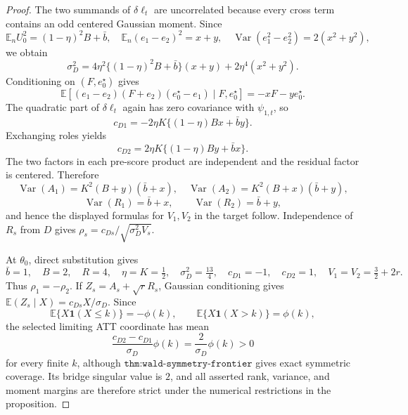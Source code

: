 \documentclass{article}
\begin{document}
\begin{proof}
The two summands of \(\delta\ell_t\) are uncorrelated because every cross term contains an odd centered Gaussian moment.  Since
\[
 \mathbb E_nU_0^2=(1-\eta)^2B+\bar b,\quad
 \mathbb E_n(e_1-e_2)^2=x+y,\quad
 \operatorname{Var}(e_1^2-e_2^2)=2(x^2+y^2),
\]
we obtain
\[
 \sigma_D^2=4\eta^2\{(1-\eta)^2B+\bar b\}(x+y)
 +2\eta^4(x^2+y^2).
\]
Conditioning on \((F,e_0^{\star})\) gives
\[
 \mathbb E[(e_1-e_2)(F+e_2)(e_0^{\star}-e_1)\mid F,e_0^{\star}]
 =-xF-ye_0^{\star}.
\]
The quadratic part of \(\delta\ell_t\) again has zero covariance with \(\psi_{1,t}\), so
\[
 c_{D1}=-2\eta K\{(1-\eta)Bx+\bar b y\}.
\]
Exchanging roles yields
\[
 c_{D2}=2\eta K\{(1-\eta)By+\bar b x\}.
\]
The two factors in each pre-score product are independent and the residual factor is centered.  Therefore
\[
 \operatorname{Var}(A_1)=K^2(B+y)(\bar b+x),
 \quad \operatorname{Var}(A_2)=K^2(B+x)(\bar b+y),
\]
\[
 \operatorname{Var}(R_1)=\bar b+x,\qquad
 \operatorname{Var}(R_2)=\bar b+y,
\]
and hence the displayed formulas for \(V_1,V_2\) in the target follow.  Independence of \(R_s\) from \(D\) gives \(\rho_s=c_{Ds}/\sqrt{\sigma_D^2V_s}\).

At \(\theta_0\), direct substitution gives
\[
 \bar b=1,\quad B=2,\quad R=4,\quad \eta=K=\tfrac12,
 \quad \sigma_D^2=\tfrac{13}4,\quad c_{D1}=-1,\quad c_{D2}=1,
 \quad V_1=V_2=\tfrac32+2r.
\]
Thus \(\rho_1=-\rho_2\).  If \(Z_s=A_s+\sqrt rR_s\), Gaussian conditioning gives \(\mathbb E(Z_s\mid X)=c_{Ds}X/\sigma_D\).  Since
\[
 \mathbb E\{X\mathbf1(X\leq k)\}=-\phi(k),\qquad
 \mathbb E\{X\mathbf1(X>k)\}=\phi(k),
\]
the selected limiting ATT coordinate has mean
\[
 \frac{c_{D2}-c_{D1}}{\sigma_D}\phi(k)=\frac2{\sigma_D}\phi(k)>0
\]
for every finite \(k\), although \(\texttt{thm:wald-symmetry-frontier}\) gives exact symmetric coverage.  Its bridge singular value is \(2\), and all asserted rank, variance, and moment margins are therefore strict under the numerical restrictions in the proposition.


\end{proof}
\end{document}

